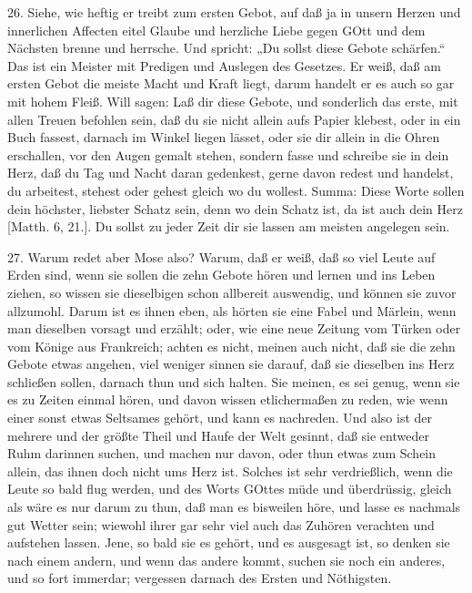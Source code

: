 26. Siehe, wie heftig er treibt zum ersten Gebot, auf daß ja in unsern Herzen und innerlichen Affecten eitel Glaube und herzliche Liebe gegen GOtt und dem Nächsten brenne und herrsche. Und spricht: „Du sollst diese Gebote schärfen.“ Das ist ein Meister mit Predigen und Auslegen des Gesetzes. Er weiß, daß am ersten Gebot die meiste Macht und Kraft liegt, darum handelt er es auch so gar mit hohem Fleiß. Will sagen: Laß dir diese Gebote, und sonderlich das erste, mit allen Treuen befohlen sein, daß du sie nicht allein aufs Papier klebest, oder in ein Buch fassest, darnach im Winkel
liegen lässet, oder sie dir allein in die Ohren erschallen, vor den Augen gemalt stehen, sondern fasse und schreibe sie in dein Herz, daß du Tag und Nacht daran gedenkest, gerne davon redest und handelst, du arbeitest, stehest oder gehest gleich wo du wollest. Summa: Diese Worte sollen dein höchster, liebster Schatz sein, denn wo dein Schatz ist, da ist auch dein Herz [Matth. 6, 21.]. Du sollst zu jeder Zeit dir sie lassen am meisten angelegen sein.

27. Warum redet aber Mose also? Warum, daß er weiß, daß so viel Leute auf Erden sind, wenn sie sollen die zehn Gebote hören und lernen und ins Leben ziehen, so wissen sie dieselbigen schon allbereit auswendig, und können sie zuvor allzumohl. Darum ist es ihnen eben, als hörten sie eine Fabel und Märlein, wenn man dieselben vorsagt und erzählt; oder, wie eine neue Zeitung vom Türken oder vom Könige aus Frankreich; achten es nicht, meinen auch nicht, daß sie die zehn Gebote etwas angehen, viel weniger sinnen sie darauf, daß sie dieselben ins Herz schließen sollen, darnach thun und sich halten. Sie meinen, es sei genug, wenn sie es zu Zeiten einmal hören, und davon wissen etlichermaßen zu reden, wie wenn einer sonst etwas Seltsames gehört, und kann es nachreden. Und also ist der mehrere und der größte Theil und Haufe der Welt gesinnt, daß sie entweder Ruhm darinnen suchen, und machen nur davon, oder thun etwas zum Schein allein, das ihnen doch nicht ums Herz ist. Solches ist sehr verdrießlich, wenn die Leute so bald flug werden, und des Worts GOttes müde und überdrüssig, gleich als wäre es nur darum zu thun, daß man es bisweilen höre, und lasse es nachmals gut Wetter sein; wiewohl ihrer gar sehr viel auch das Zuhören verachten und aufstehen lassen. Jene, so bald sie es gehört, und es ausgesagt ist, so denken sie nach einem andern, und wenn das andere kommt, suchen sie noch ein anderes, und so fort immerdar; vergessen darnach des Ersten und Nöthigsten.

